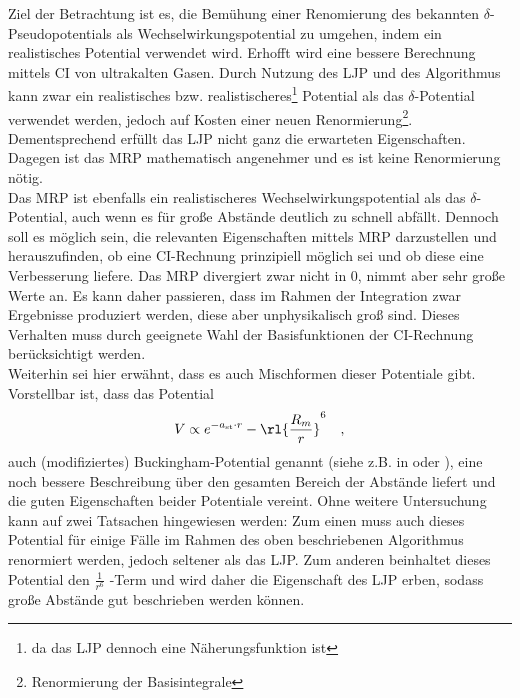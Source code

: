 Ziel der Betrachtung ist es, die Bemühung einer Renomierung des bekannten 
$\delta$-Pseudopotentials als Wechselwirkungspotential zu umgehen, indem ein 
realistisches Potential verwendet wird. Erhofft wird eine bessere Berechnung 
mittels CI von ultrakalten Gasen. Durch Nutzung des LJP und 
des 
Algorithmus kann zwar ein realistisches bzw. 
realistischeres\footnote{da das 
LJP dennoch eine Näherungsfunktion ist} Potential als das 
$\delta$-Potential 
verwendet werden, jedoch auf Kosten einer neuen 
Renormierung\footnote{Renormierung der Basisintegrale}. Dementsprechend 
erfüllt das LJP nicht ganz die erwarteten Eigenschaften. 
Dagegen ist das MRP 
mathematisch angenehmer und es ist keine Renormierung nötig. \\
Das MRP ist ebenfalls ein realistischeres Wechselwirkungspotential als das 
$\delta$-Potential, auch wenn es für große Abstände deutlich zu schnell 
abfällt. 
Dennoch soll es möglich sein, die relevanten Eigenschaften 
mittels MRP 
darzustellen und herauszufinden, ob eine CI-Rechnung 
prinzipiell möglich sei 
und ob diese eine Verbesserung liefere. Das MRP divergiert 
zwar nicht in 0, 
nimmt aber sehr große Werte an. Es kann daher passieren, dass im Rahmen der 
Integration zwar Ergebnisse produziert werden, diese aber unphysikalisch groß 
sind. Dieses Verhalten muss durch geeignete Wahl der Basisfunktionen der 
CI-Rechnung berücksichtigt werden.   \\

Weiterhin sei hier erwähnt, dass es auch Mischformen dieser Potentiale gibt. 
Vorstellbar ist, dass das Potential
%
\begin{align}
V\propto e^{-a_\text{st}\cdot r}-\rl{\frac{R_m}{r}}^6 \quad,
\end{align}
%
auch (modifiziertes) Buckingham-Potential genannt (siehe z.B. in \cite{av:2b} 
oder 
\cite{av:3b}), eine noch bessere 
Beschreibung über den gesamten Bereich der Abstände liefert und die guten 
Eigenschaften beider Potentiale vereint. Ohne weitere Untersuchung kann auf 
zwei Tatsachen hingewiesen werden: Zum einen muss auch dieses 
Potential für 
einige Fälle im Rahmen des oben beschriebenen Algorithmus renormiert werden, 
jedoch seltener als das LJP. Zum anderen 
beinhaltet dieses Potential den $\frac{1}{r^6}$ -Term und wird daher die 
Eigenschaft des LJP erben, sodass große Abstände gut 
beschrieben werden können.
%
%
%
